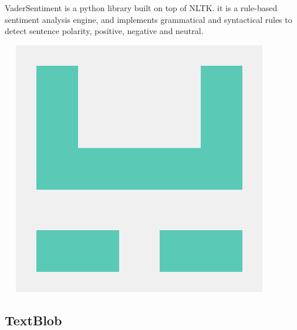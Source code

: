 \begin{minipage}{0.68\textwidth}
VaderSentiment is a python library built on top of NLTK. it is a rule-based sentiment analysis engine, and implements grammatical and syntactical rules to detect sentence polarity, positive, negative and neutral.
\end{minipage}%
%
\begin{minipage}{0.3\textwidth}
  {\ ~}\hfill
  \includegraphics[width=.8\textwidth]{images/VaderSentiment_logo}
\end{minipage}



\subsection{TextBlob}

